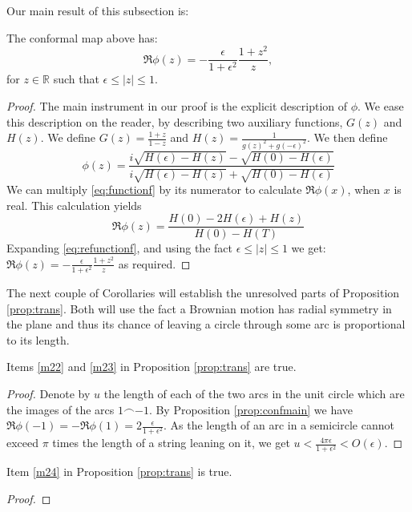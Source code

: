 {Our main result of this subsection is:
\begin{propos}\label{prop:confmain}
The conformal map above has:
$$\Re \phi(z) = -\frac{\epsilon}{1+\epsilon^2}\frac{1+z^2}{z},$$
for $z\in\mathbb{R}$ such that $\epsilon\le|z|\le1$.
\end{propos}
\begin{proof}
The main instrument in our proof is the explicit description of $\phi$.
We ease this description on the reader, by describing two
auxiliary functions, $G(z)$ and $H(z)$. We define $G(z)=\frac{1+z}{1-z}$
and $H(z)=\frac1{g(z)^2+g(-\epsilon)^2}$. We then define
\begin{equation}\label{eq:functionf}
\phi(z)=\frac{i\sqrt{H(\epsilon)-H(z)}-\sqrt{H(0)-H(\epsilon)}}{i\sqrt{H(\epsilon)-H(z)}+\sqrt{H(0)-H(\epsilon)}}
\end{equation}
We can multiply \eqref{eq:functionf} by its numerator to calculate $\Re \phi(x)$, when $x$ is real. This calculation yields
\begin{equation}\label{eq:refunctionf}
\Re \phi(z)=\frac{H(0)-2H(\epsilon)+H(z)}{H(0)-H(T)}
\end{equation}
Expanding \eqref{eq:refunctionf}, and using the fact $\epsilon\le |z|\le1$ we get:
$\Re \phi(z) = -\frac{\epsilon}{1+\epsilon^2}\frac{1+z^2}{z}$ as required.
\end{proof}

The next couple of Corollaries will establish the unresolved parts of Proposition \ref{prop:trans}. Both will use the fact a Brownian motion has radial symmetry in the plane and thus its chance of leaving a circle through some arc is proportional to its length.

\begin{cor}\label{m22and23true}
Items \ref{m22} and \ref{m23} in Proposition \ref{prop:trans} are true.
\end{cor}
\begin{proof}
Denote by $u$ the length of each of the two arcs in the unit circle which are the images of the arcs $1\frown-1$. By Proposition \ref{prop:confmain} we have $\Re \phi(-1)=-\Re \phi(1)=2\frac{\epsilon}{1+\epsilon^2}$. As the length of an arc in a semicircle cannot exceed $\pi$ times the length of a string leaning on it, we get $u<\frac{4\pi\epsilon}{1+\epsilon^2}<O(\epsilon)$.
\end{proof}

\begin{cor}\label{m24true}
Item \ref{m24} in Proposition \ref{prop:trans} is true.
\end{cor}
\begin{proof}


\end{proof}}
